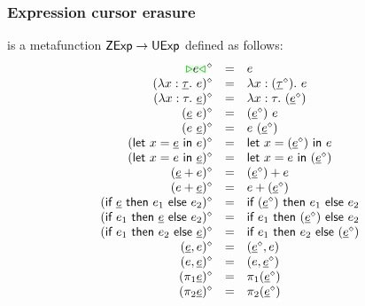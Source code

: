 \documentclass[formalism.tex]{subfiles}
\begin{document}
\subsubsection{Expression cursor erasure}
\label{sec:untyped-expression-cursor-erasure}
\judgbox{\ensuremath{\cursorErase{\ZMV}}} is a metafunction ${\normalfont\textsf{ZExp}} \to {\normalfont\textsf{UExp}}$ defined as follows:
%
\[\begin{array}{rcl}
  \cursorErasesToRow{\ZCursor{\EMV}}{\EMV} \\
  \cursorErasesToRow{(\ZLamT{x}{\ZTMV}{\EMV})}{\ELam{x}{(\cursorErase{\ZTMV})}{\EMV}} \\
  \cursorErasesToRow{(\ZLamE{x}{\TMV}{\ZMV})}{\ELam{x}{\TMV}{(\cursorErase{\ZMV})}} \\
  \cursorErasesToRow{(\ZApL{\ZMV}{\EMV})}{\EAp{(\cursorErase{\ZMV})}{\EMV}} \\
  \cursorErasesToRow{(\ZApR{\EMV}{\ZMV})}{\EAp{\EMV}{(\cursorErase{\ZMV})}} \\
  \cursorErasesToRow{(\ZLetL{x}{\ZMV}{\EMV})}{\ELet{x}{(\cursorErase{\ZMV})}{\EMV}} \\
  \cursorErasesToRow{(\ZLetR{x}{\EMV}{\ZMV})}{\ELet{x}{\EMV}{(\cursorErase{\ZMV})}} \\
  \cursorErasesToRow{(\ZPlusL{\ZMV}{\EMV})}{\EPlus{(\cursorErase{\ZMV})}{\EMV}} \\
  \cursorErasesToRow{(\ZPlusR{\EMV}{\ZMV})}{\EPlus{\EMV}{(\cursorErase{\ZMV})}} \\
  \cursorErasesToRow{(\ZIfC{\ZMV}{\EMV_1}{\EMV_2})}{\EIf{(\cursorErase{\ZMV})}{\EMV_1}{\EMV_2}} \\
  \cursorErasesToRow{(\ZIfL{\EMV_1}{\ZMV}{\EMV_2})}{\EIf{\EMV_1}{(\cursorErase{\ZMV})}{\EMV_2}} \\
  \cursorErasesToRow{(\ZIfL{\EMV_1}{\EMV_2}{\ZMV})}{\EIf{\EMV_1}{\EMV_2}{(\cursorErase{\ZMV})}} \\
  \cursorErasesToRow{\ZPairL{\ZMV}{\EMV}}{\EPair{\cursorErase{\ZMV}}{\EMV}} \\
  \cursorErasesToRow{\ZPairR{\EMV}{\ZMV}}{\EPair{\EMV}{\cursorErase{\ZMV}}} \\
  \cursorErasesToRow{(\ZProjL{\ZMV})}{\EProjL{(\cursorErase{\ZMV})}} \\
  \cursorErasesToRow{(\ZProjR{\ZMV})}{\EProjR{(\cursorErase{\ZMV})}} \\
\end{array}\]
\end{document}
